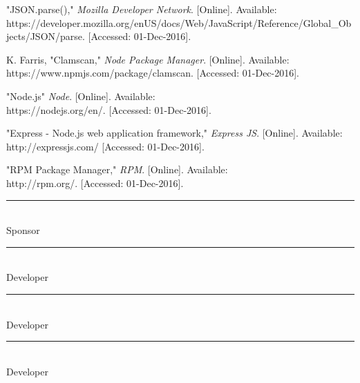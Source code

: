 \documentclass[letterpaper, 10pt,titlepage]{article}
\begin{document}
\begin{thebibliography}{15}
"JSON.parse()," \textit{Mozilla Developer Network}.
[Online]. Available: \\ 
https://developer.mozilla.org/en\-US/docs/Web/JavaScript/Reference/Global\_Objects/JSON/parse.
[Accessed: 01-Dec-2016]. \par

K. Farris, "Clamscan," \textit{Node Package Manager}.
[Online]. Available: \\ 
https://www.npmjs.com/package/clamscan.
[Accessed: 01-Dec-2016]. \par

"Node.js" \textit{Node}.
[Online]. Available: \\ 
https://nodejs.org/en/.
[Accessed: 01-Dec-2016]. \par

"Express - Node.js web application framework," \textit{Express JS}.
[Online]. Available: \\ 
http://expressjs.com/
[Accessed: 01-Dec-2016]. 

"RPM Package Manager," \textit{RPM}.
[Online]. Available: \\  
http://rpm.org/.
[Accessed: 01-Dec-2016]. \par

\end{thebibliography}


\newpage
\textbf{ }
\vspace{5.0cm}

\noindent\rule{13cm}{0.4pt}\\
Sponsor
\vspace{3.0cm}

\noindent\rule{13cm}{0.4pt}\\
Developer
\vspace{3.0cm}


\noindent\rule{13cm}{0.4pt}\\
Developer
\vspace{3.0cm}


\noindent\rule{13cm}{0.4pt}\\
Developer
\vspace{3.0cm}
\end{document}

